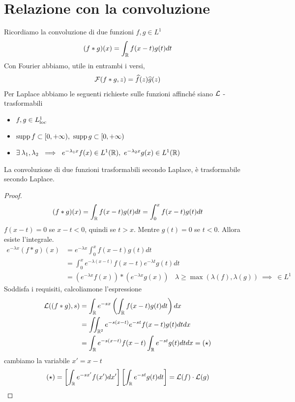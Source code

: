 \section{Relazione con la convoluzione}

Ricordiamo la convoluzione di due funzioni $f, g\in L^{1}$
\begin{equation*}
(f*g)(x) = \int_{\mathbb{R}} f(x - t) g(t) dt
\end{equation*}
Con Fourier abbiamo, utile in entrambi i versi,
\begin{equation*}
\mathcal{F}(f*g, z) = \widehat{f}(z)\widehat{g}(z)
\end{equation*}
Per Laplace abbiamo le seguenti richieste sulle funzioni affinché siano $\mathcal{L}$ - trasformabili
\begin{itemize}
\item $f, g\in L^{1}_{\operatorname{loc}}$
\item $\operatorname*{supp} f\subset [0, + \infty), \ \operatorname*{supp} g\subset [0, + \infty)$
\item $\exists \lambda_{1}, \lambda_{2} \ \implies \ e^{- \lambda_{1} x} f(x) \in L^{1}(\RR), \ e^{- \lambda_{2} x} g(x) \in L^{1}(\RR)$
\end{itemize}
\begin{thm}
La convoluzione di due funzioni trasformabili secondo Laplace, è trasformabile secondo Laplace.
\end{thm}
\begin{proof}
\begin{equation*}
(f*g)(x) = \int_{\mathbb{R}} f(x - t) g(t) dt = \int^{x}_{0} f(x - t) g(t) dt
\end{equation*}
$f(x - t) = 0$ se $x - t < 0$, quindi se $t > x$. Mentre $g(t) = 0$ se $t < 0$. Allora esiste l'integrale.
\begin{align*}
e^{- \lambda x}(f*g)(x) & = e^{- \lambda x}\int^{x}_{0} f(x - t) g(t) dt\\
 & = \int^{x}_{0} e^{- \lambda (x - t)} f(x - t) e^{- \lambda t} g(t) dt\\
 & = \left(e^{- \lambda x} f(x)\right) *\left(e^{- \lambda x} g(x)\right) \ \ \ \ \lambda \geq \max(\lambda (f), \lambda (g)) \ \implies \ \in L^{1}
\end{align*}
Soddisfa i requisiti, calcoliamone l'espressione
\begin{align*}
\mathcal{L}((f*g), s) & = \int_{\mathbb{R}} e^{- sx}\left(\int_{\mathbb{R}} f(x - t) g(t) dt\right) dx\\
 & = \iint_{\mathbb{R}^{2}} e^{- s(x - t)} e^{- st} f(x - t) g(t) dtdx\\
 & = \int_{\mathbb{R}} e^{- s(x - t)} f(x - t)\int_{\mathbb{R}} e^{- st} g(t) dtdx = (\star)
\end{align*}
cambiamo la variabile $x' = x - t$
\begin{gather*}
(\star) = \left[\int_{\mathbb{R}} e^{- sx'} f(x') dx'\right]\left[\int_{\mathbb{R}} e^{- st} g(t) dt\right] = \mathcal{L}(f) \cdot \mathcal{L}(g)
\end{gather*}
\end{proof}

